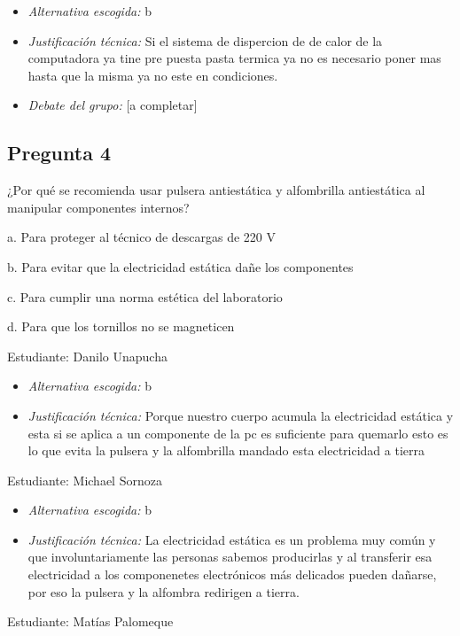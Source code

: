 \documentclass{article}
\begin{document}
\begin{itemize}
\item \emph{Alternativa escogida:} b
\item \emph{Justificación técnica:} Si el sistema de dispercion de de calor de
la computadora ya tine pre puesta pasta termica ya no es necesario
poner mas hasta que la misma ya no este en condiciones.

\item \emph{Debate del grupo:} [a completar]
\end{itemize}


\subsection{Pregunta 4}
\label{sec:orgf47de32}
¿Por qué se recomienda usar pulsera antiestática y alfombrilla antiestática al manipular componentes internos?

a. Para proteger al técnico de descargas de 220 V

b. Para evitar que la electricidad estática dañe los componentes

c. Para cumplir una norma estética del laboratorio

d. Para que los tornillos no se magneticen

Estudiante: Danilo Unapucha

\begin{itemize}
\item \emph{Alternativa escogida:} b
\item \emph{Justificación técnica:} Porque nuestro cuerpo acumula la
electricidad estática y esta si se aplica a un componente de la pc
es suficiente para quemarlo esto es lo que evita la pulsera y la
alfombrilla mandado esta electricidad a tierra
\end{itemize}

Estudiante: Michael Sornoza

\begin{itemize}
\item \emph{Alternativa escogida:} b
\item \emph{Justificación técnica:} La electricidad estática es un problema muy común y que involuntariamente las personas
sabemos producirlas y al transferir esa electricidad a los componenetes electrónicos más delicados pueden
dañarse, por eso la pulsera y la alfombra redirigen a tierra.
\end{itemize}

Estudiante: Matías Palomeque
\end{document}

